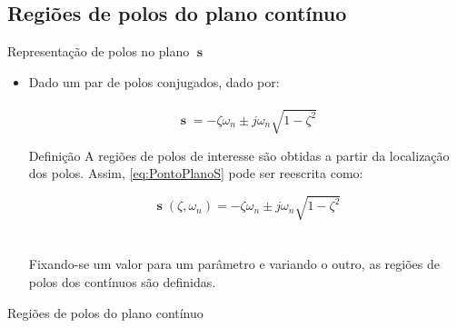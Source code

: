 \documentclass[aspectratio=169,11pt,t,xcolor={usenames,dvipsnames,x11names}]{beamer}
\DeclareMathOperator{\s}{\textbf{s}}
\begin{document}
\subsection{Regiões de polos do plano contínuo}
\begin{frame}{Representação de polos no plano $\s$}
	\begin{itemize}
		\item Dado um par de polos conjugados, dado por:\\~\\
		
		\begin{equation}
			\s = -\zeta\omega_n \pm j\omega_n\sqrt{1-\zeta^2}\label{eq:PontoPlanoS}
		\end{equation}\pause
		
		\begin{block}{Definição}
			A regiões de polos de interesse são obtidas a partir da localização dos polos. Assim, \eqref{eq:PontoPlanoS} pode ser reescrita como:
			
			\begin{equation}
				\s(\zeta,\omega_n) = -\zeta\omega_n \pm j\omega_n\sqrt{1-\zeta^2}
			\end{equation}
			\\~\\
			Fixando-se um valor para um parâmetro e variando o outro, as regiões de polos dos contínuos são definidas.
		\end{block}
	\end{itemize}
\end{frame}

\begin{frame}[c]{Regiões de polos do plano contínuo}
	\begin{figure}[!ht]
		\centering
		\begin{subfigure}[t]{0.3\columnwidth}
				
		\end{subfigure}\pause\quad
		\begin{subfigure}[t]{0.3\columnwidth}
				
		\end{subfigure}\pause\quad
		\begin{subfigure}[t]{0.3\columnwidth}
			
		\end{subfigure}
	\end{figure}
\end{frame}
\end{document}
